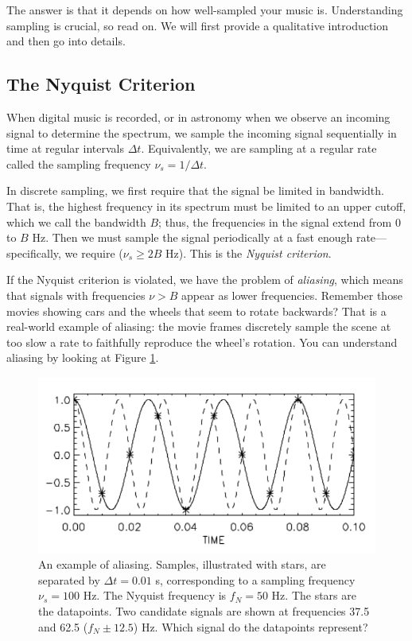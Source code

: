 \documentclass[11pt,preprint]{aastex}
\begin{document}
The answer is that it depends on how well-sampled your music is. Understanding
sampling is crucial, 
so read on. We will first provide a qualitative introduction
and then go into details.

\subsection {The Nyquist Criterion}

	When digital music is recorded, or in astronomy when we observe
an incoming signal to determine the spectrum, we
sample the incoming signal sequentially in time at regular intervals
$\Delta t$.  Equivalently,
we are sampling at a regular rate called the sampling frequency
$\nu_{s} = 1/\Delta t$.

	In discrete sampling, we first require that the signal be
limited in bandwidth.  That is, the highest frequency in its spectrum
must be limited to an upper cutoff, which we call the bandwidth $B$;
thus, the frequencies in the signal extend from 0 to $B$ Hz.  Then we
must sample the signal periodically at a fast enough
rate---specifically, we require ($\nu_{s} \ge 2 B$ Hz).  This is the
{\it Nyquist criterion}.

If the Nyquist criterion is violated, we have
the problem of {\it aliasing}, which means that signals with frequencies
$\nu > B$ appear as lower frequencies.  Remember those
movies showing cars and the wheels that seem to rotate backwards? That is
a real-world example of aliasing: the movie frames discretely sample the
scene at too slow a rate to faithfully reproduce the wheel's rotation. 
You can understand aliasing by looking at Figure \ref{figone}. 

\begin{figure}[H]
\begin{center}
\leavevmode
 \includegraphics[width=6.0in, clip=true]{fig1}
\end{center}
\label{figone}
\caption{An example of aliasing. Samples, illustrated with stars,
are separated by $\Delta t= 0.01$
s, corresponding to a sampling frequency $\nu_{s} = 100$ Hz. The Nyquist
frequency is $f_N=50$ Hz. The stars are the datapoints. 
Two candidate signals are
shown at frequencies 37.5 and 62.5 ($f_N \pm 12.5$) Hz. Which
signal do the datapoints represent?  }
\end{figure}
\end{document}
